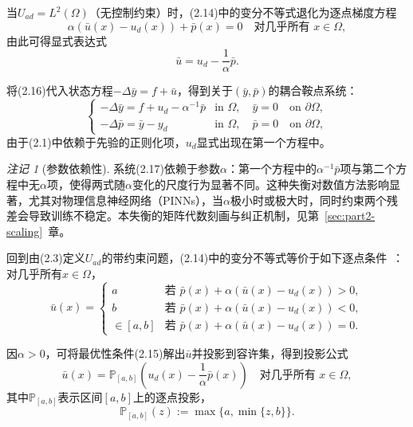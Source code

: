 \documentclass{xmu}
\theoremstyle{plain}
\theoremstyle{remark}
\newtheorem{remark}[theorem]{注记}
\begin{document}
当$U_{ad} = L^2(\Omega)$（无控制约束）时，(2.14)中的变分不等式退化为逐点梯度方程
\begin{equation}
\alpha(\bar{u}(x) - u_d(x)) + \bar{p}(x) = 0 \quad \text{对几乎所有 } x \in \Omega,
\end{equation}
由此可得显式表达式
\begin{equation}
\bar{u} = u_d - \frac{1}{\alpha}\bar{p}.
\end{equation}

将(2.16)代入状态方程$-\Delta \bar{y} = f + \bar{u}$，得到关于$(\bar{y}, \bar{p})$的耦合鞍点系统：
\begin{equation}
\begin{cases}
-\Delta \bar{y} = f + u_d - \alpha^{-1}\bar{p} & \text{in } \Omega, \quad \bar{y} = 0 \quad \text{on } \partial\Omega, \\[6pt]
-\Delta \bar{p} = \bar{y} - y_d & \text{in } \Omega, \quad \bar{p} = 0 \quad \text{on } \partial\Omega,
\end{cases}
\end{equation}
由于(2.1)中依赖于先验的正则化项，$u_d$显式出现在第一个方程中。

\begin{remark}[参数依赖性]
系统(2.17)依赖于参数$\alpha$：第一个方程中的$\alpha^{-1}\bar{p}$项与第二个方程中无$\alpha$项，使得两式随$\alpha$变化的尺度行为显著不同。这种失衡对数值方法影响显著，尤其对物理信息神经网络（PINNs），当$\alpha$极小时或极大时，同时约束两个残差会导致训练不稳定。本失衡的矩阵代数刻画与纠正机制，见第~\ref{sec:part2-scaling}~章。
\end{remark}

回到由(2.3)定义$U_{ad}$的带约束问题，(2.14)中的变分不等式等价于如下逐点条件~\cite[引理2.26]{1}：对几乎所有$x \in \Omega$，
\begin{equation}
\bar{u}(x) =
\begin{cases}
a & \text{若 } \bar{p}(x) + \alpha(\bar{u}(x) - u_d(x)) > 0, \\[3pt]
b & \text{若 } \bar{p}(x) + \alpha(\bar{u}(x) - u_d(x)) < 0, \\[3pt]
\in [a, b] & \text{若 } \bar{p}(x) + \alpha(\bar{u}(x) - u_d(x)) = 0.
\end{cases}
\end{equation}

因$\alpha > 0$，可将最优性条件(2.15)解出$\bar{u}$并投影到容许集，得到投影公式
\begin{equation}
\bar{u}(x) = \mathbb{P}_{[a,b]} \left( u_d(x) - \frac{1}{\alpha}\bar{p}(x) \right) \quad \text{对几乎所有 } x \in \Omega,
\end{equation}
其中$\mathbb{P}_{[a,b]}$表示区间$[a,b]$上的逐点投影，
$$ \mathbb{P}_{[a,b]}(z) := \max\bigl\{a, \min\{z, b\}\bigr\}. $$
\end{document}
